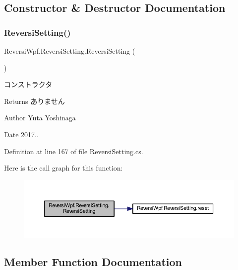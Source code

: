 \subsection{Constructor \& Destructor Documentation}
\mbox{\label{class_reversi_wpf_1_1_reversi_setting_acc35415380efbe8facc60fb8c4c443dd}} 
\subsubsection{\texorpdfstring{Reversi\+Setting()}{ReversiSetting()}}
{\footnotesize\ttfamily Reversi\+Wpf.\+Reversi\+Setting.\+Reversi\+Setting (\begin{DoxyParamCaption}{ }\end{DoxyParamCaption})}



コンストラクタ 

\begin{DoxyReturn}{Returns}
ありません 
\end{DoxyReturn}
\begin{DoxyAuthor}{Author}
Yuta Yoshinaga 
\end{DoxyAuthor}
\begin{DoxyDate}{Date}
2017.. 
\end{DoxyDate}


Definition at line 167 of file Reversi\+Setting.\+cs.

Here is the call graph for this function\+:\nopagebreak
\begin{figure}[H]
\begin{center}
\leavevmode
\includegraphics[width=350pt]{class_reversi_wpf_1_1_reversi_setting_acc35415380efbe8facc60fb8c4c443dd_cgraph}
\end{center}
\end{figure}


\subsection{Member Function Documentation}
\mbox{\label{class_reversi_wpf_1_1_reversi_setting_a62057d7ef379815b2e55f8543d3de080}} 
